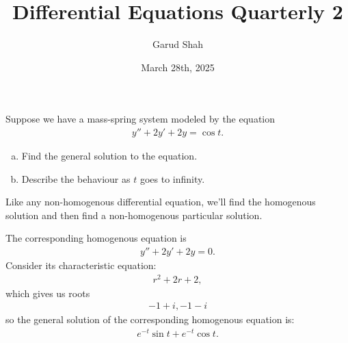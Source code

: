 \documentclass[11pt]{article}
\title{Differential Equations Quarterly \textbf{2}}
\author{Garud Shah}
\date{March 28th, 2025}
\begin{document}
    \maketitle \newpage 
    \newpage \setcounter{equation}{-1}  \begin{problem} [Problem 1]
        Suppose we have a mass-spring system modeled by the equation
        \begin{align}
            y'' + 2y' + 2y = \cos t.
        \end{align}
        \begin{enumerate}[(a)]
            \item Find the general solution to the equation.
            \item Describe the behaviour as $t$ goes to infinity.
        \end{enumerate}
    \end{problem}
        \begin{remark}[Method.]
            Like any non-homogenous differential equation, we'll find the homogenous solution and then find a non-homogenous particular solution.
        \end{remark}
        \begin{solution}[Solution 1a]
            The corresponding homogenous equation is
            \begin{align}
                y'' + 2y' + 2y = 0.
            \end{align}
            Consider its characteristic equation:
            \begin{align}
                r^2+2r+2,
            \end{align}
            which gives us roots 
            \begin{align}
                -1+i, -1-i
            \end{align}
            so the general solution of the corresponding homogenous equation is:
            \begin{align}
                e^{-t}\sin t + e^{-t}\cos t.
            \end{align}
        \end{solution}
        \newpage
\end{document}
